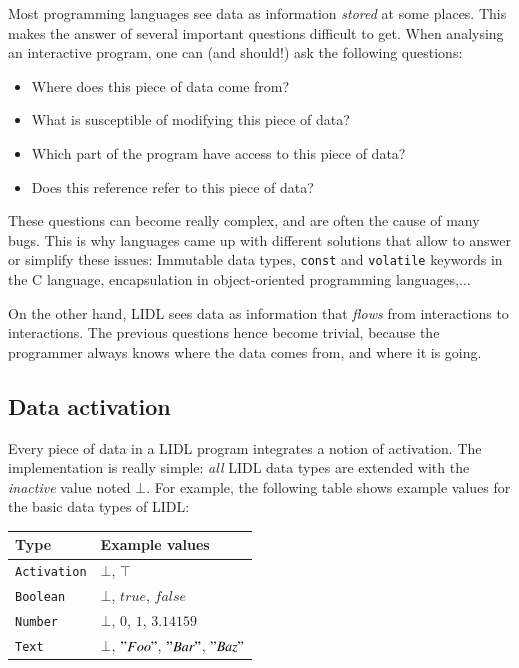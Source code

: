 \documentclass[10pt]{sigplanconf}
\newcommand{\code}[1]{\lstinline{#1}}
\begin{document}
Most programming languages see data as information \emph{stored} at some places. This makes the answer of several important questions difficult to get. When analysing an interactive program, one can (and should!) ask the following questions: 

\begin{itemize}
  \item Where does this piece of data come from?
  \item What is susceptible of modifying this piece of data?
  \item Which part of the program have access to this piece of data?
  \item Does this reference refer to this piece of data?
\end{itemize}

These questions can become really complex, and are often the cause of many bugs. This is why languages came up with different solutions that allow to answer or simplify these issues: Immutable data types, \code{const} and \code{volatile} keywords in the C language, encapsulation in object-oriented programming languages,...

On the other hand, LIDL sees data as information that \emph{flows} from interactions to interactions. The previous questions hence become trivial, because the programmer always knows where the data comes from, and where it is going.


\subsection{Data activation}


Every piece of data in a LIDL program integrates a notion of activation. The implementation is really simple: \emph{all} LIDL data types are extended with the \emph{inactive} value noted $\bot$. For example, the following table shows example values for the basic data types of LIDL:

\begin{tabularx}{\linewidth}{l|X}
  Type & Example values \\
  \hline
  \texttt{Activation} & $\bot$, $\top$ \\
  \texttt{Boolean} &  $\bot$, $true$, $false$ \\
  \texttt{Number} &  $\bot$, $0$, $1$, $3.14159$ \\
  \texttt{Text} &  $\bot$, $"Foo"$, $"Bar"$, $"Baz"$ \\
\end{tabularx}
\end{document}
